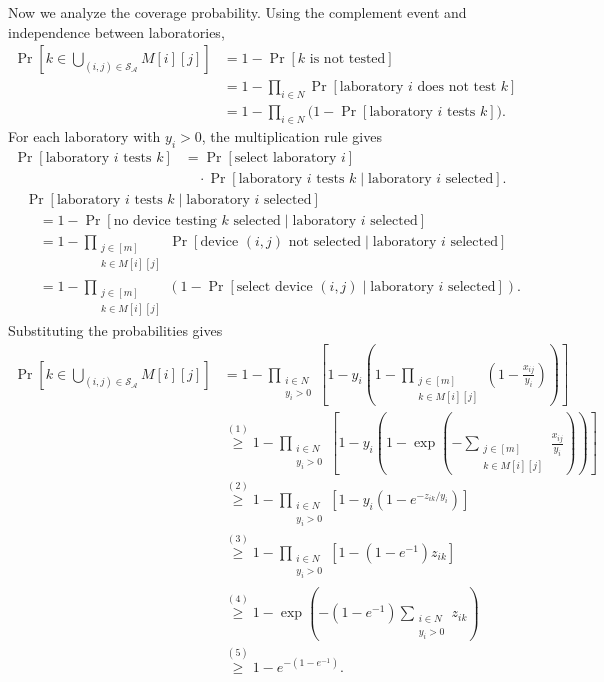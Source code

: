 \documentclass[12pt,a4paper]{article}
\begin{document}
Now we analyze the coverage probability. Using the complement event and independence between
laboratories,
\[
\begin{aligned}
\Pr\!\left[k\in\bigcup_{(i,j)\in\mathcal{S}_{\mathcal{A}}}M[i][j]\right]
&=1-\Pr[k\text{ is not tested}]\\
&=1-\prod_{i\in N}\Pr[\text{laboratory }i\text{ does not test }k]\\
&=1-\prod_{i\in N}\bigl(1-\Pr[\text{laboratory }i\text{ tests }k]\bigr).
\end{aligned}
\]
For each laboratory with $y_i>0$, the multiplication rule gives
\[
\begin{aligned}
\Pr[\text{laboratory }i\text{ tests }k]
&=\Pr[\text{select laboratory }i]\\
&\quad\cdot\Pr[\text{laboratory }i\text{ tests }k\mid\text{laboratory }i\text{ selected}].
\end{aligned}
\]
\[
\begin{aligned}
&\Pr[\text{laboratory }i\text{ tests }k\mid\text{laboratory }i\text{ selected}]\\
&\quad=1-\Pr[\text{no device testing }k\text{ selected}\mid\text{laboratory }i\text{ selected}]\\
&\quad=1-\prod_{\substack{j\in[m]\\k\in M[i][j]}}
\Pr[\text{device }(i,j)\text{ not selected}\mid\text{laboratory }i\text{ selected}]\\
&\quad=1-\prod_{\substack{j\in[m]\\k\in M[i][j]}}
\left(1-\Pr[\text{select device }(i,j)\mid\text{laboratory }i\text{ selected}]\right).
\end{aligned}
\]
Substituting the probabilities gives
\[
\begin{aligned}
\Pr\!\left[k\in\bigcup_{(i,j)\in\mathcal{S}_{\mathcal{A}}}M[i][j]\right]
&=1-\prod_{\substack{i\in N\\y_i>0}}
\left[1-y_i\left(1-\prod_{\substack{j\in[m]\\k\in M[i][j]}}
\left(1-\frac{x_{ij}}{y_i}\right)\right)\right]\\
&\overset{(1)}{\geq}1-\prod_{\substack{i\in N\\y_i>0}}
\left[1-y_i\left(1-\exp\!\left(-\sum_{\substack{j\in[m]\\k\in M[i][j]}}
\frac{x_{ij}}{y_i}\right)\right)\right]\\
&\overset{(2)}{\geq}1-\prod_{\substack{i\in N\\y_i>0}}
\left[1-y_i\left(1-e^{-z_{ik}/y_i}\right)\right]\\
&\overset{(3)}{\geq}1-\prod_{\substack{i\in N\\y_i>0}}
\left[1-(1-e^{-1})z_{ik}\right]\\
&\overset{(4)}{\geq}1-\exp\!\left(-(1-e^{-1})
\sum_{\substack{i\in N\\y_i>0}}z_{ik}\right)\\
&\overset{(5)}{\geq}1-e^{-(1-e^{-1})}.
\end{aligned}
\]
\end{document}
